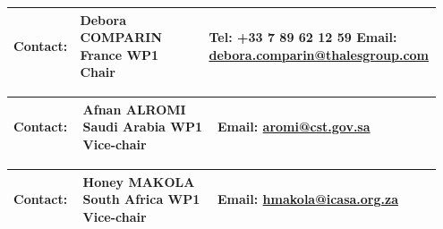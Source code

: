 \begin{longtable}{p{0.15\linewidth} p{0.30\linewidth} p{0.50\linewidth}}
\midrule
\textbf{Contact:} &
Debora COMPARIN\newline
France\newline
WP1 Chair &
Tel: +33 7 89 62 12 59 \newline Email: \ul{debora.comparin@thalesgroup.com} \\
\midrule
\end{longtable}

\begin{longtable}{p{0.15\linewidth} p{0.30\linewidth} p{0.50\linewidth}}
\midrule
\textbf{Contact:} &
Afnan ALROMI\newline
Saudi Arabia\newline
WP1 Vice-chair &
Email: \ul{aromi@cst.gov.sa} \\
\midrule
\end{longtable}

\begin{longtable}{p{0.15\linewidth} p{0.30\linewidth} p{0.50\linewidth}}
\midrule
\textbf{Contact:} &
Honey MAKOLA\newline
South Africa\newline
WP1 Vice-chair &
Email: \ul{hmakola@icasa.org.za} \\
\midrule
\end{longtable}
